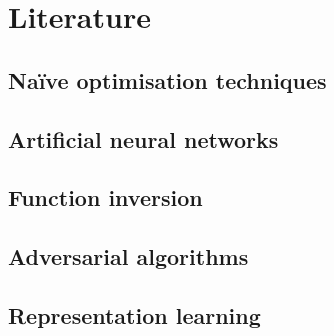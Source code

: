 \documentclass[../main.tex]{subfiles}
\begin{document}
\chapter{Literature}

\section{Na\"{i}ve optimisation techniques}

\section{Artificial neural networks}

\section{Function inversion}

\section{Adversarial algorithms}

\section{Representation learning}
\end{document}
